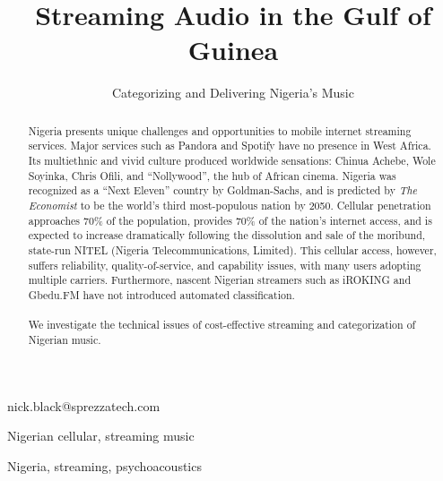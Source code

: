 \documentclass[]{sigplanconf}
\begin{document}

\title{Streaming Audio in the Gulf of Guinea}
\subtitle{Categorizing and Delivering Nigeria's Music}

           {nick.black@sprezzatech.com}

\maketitle

\begin{abstract}
Nigeria presents unique challenges and opportunities to mobile internet streaming
services. Major services such as Pandora\cite{pandoracountries} and
Spotify\cite{spotifycountries} have no presence in West Africa. Its multiethnic
and vivid culture produced worldwide sensations: Chinua Achebe, Wole Soyinka,
Chris Ofili, and ``Nollywood'', the hub of African cinema. Nigeria
was recognized as a ``Next Eleven'' country by Goldman-Sachs\cite{n11},
and is predicted by \textit{The Economist} to be the world's third most-populous
nation by 2050\cite{economist}. Cellular penetration approaches 70\% of the population\cite{nigeriamobile},
provides 70\% of the nation's internet access, and is expected to increase
dramatically following the dissolution and sale of the moribund, state-run
NITEL (Nigeria Telecommunications, Limited)\cite{reutersnitel}. This cellular access,
however, suffers reliability, quality-of-service, and capability issues, with
many users adopting multiple carriers\cite{reuterssims}. Furthermore, nascent
Nigerian streamers such as iROKING and Gbedu.FM have not introduced 
automated classification.\\
\\
We investigate the technical issues of cost-effective streaming and
categorization of Nigerian music.
\end{abstract}


\terms
Nigerian cellular, streaming music

\keywords
Nigeria, streaming, psychoacoustics
\end{document}
